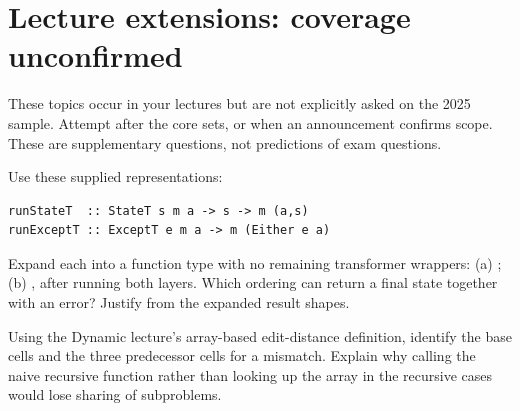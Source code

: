 \chapter{Lecture extensions: coverage unconfirmed}
These topics occur in your lectures but are not explicitly asked on the 2025
sample. Attempt after the core sets, or when an announcement confirms scope.
These are supplementary questions, not predictions of exam questions.

Use these supplied representations:
\par\noindent\begin{minipage}{\linewidth}
\begin{lstlisting}
runStateT  :: StateT s m a -> s -> m (a,s)
runExceptT :: ExceptT e m a -> m (Either e a)
\end{lstlisting}
\end{minipage}\par
Expand each into a function type with no remaining transformer wrappers:
(a) ;
(b) , after running both layers.
Which ordering can return a final state together with an error? Justify from
the expanded result shapes.

Using the Dynamic lecture's array-based edit-distance definition, identify
the base cells and the three predecessor cells for a mismatch. Explain why
calling the naive recursive function rather than looking up the array in the
recursive cases would lose sharing of subproblems.

